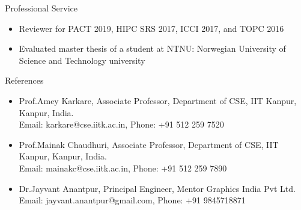 \documentclass{resume} %
\begin{document}
\begin{rSection}{Professional Service}

\begin{itemize}
\item Reviewer for PACT 2019, HIPC SRS 2017, ICCI 2017, and TOPC 2016
\item Evaluated master thesis of a student at NTNU: Norwegian University of Science and Technology university
\end{itemize}

\end{rSection}




\begin{rSection}{References}

\begin{itemize}
\item Prof.Amey Karkare, Associate Professor, Department of CSE, IIT Kanpur, Kanpur, India. \\ 
Email: karkare@cse.iitk.ac.in, Phone: +91 512 259 7520
\item Prof.Mainak Chaudhuri, Associate Professor, Department of CSE, IIT Kanpur, Kanpur, India. \\ 
Email: mainakc@cse.iitk.ac.in, Phone: +91 512 259 7890
\item Dr.Jayvant Anantpur, Principal Engineer, Mentor Graphics India Pvt Ltd. \\
Email: jayvant.anantpur@gmail.com, Phone: +91 9845718871
\end{itemize}

\end{rSection}

\pagebreak
\end{document}
